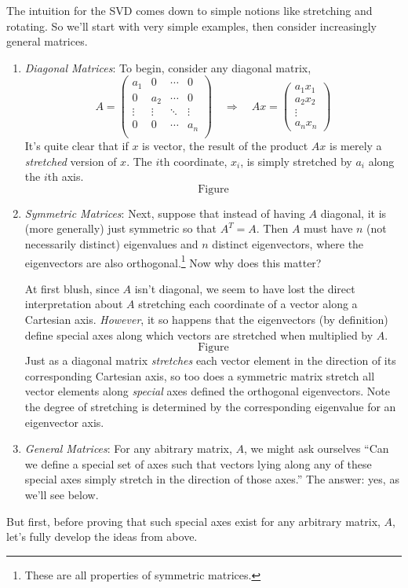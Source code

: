 \documentclass[12pt]{article}
\begin{document}
The intuition for the SVD comes down to simple notions like stretching and rotating. So we'll start with very simple examples, then consider increasingly general matrices.
\begin{enumerate}
\item {\sl Diagonal Matrices}: To begin, consider any diagonal matrix,
\[ 
    A = 
    \begin{pmatrix}
        a_1 & 0 & \cdots & 0 \\
        0 & a_2 & \cdots & 0 \\
        \vdots & \vdots & \ddots & \vdots \\
        0 & 0 & \cdots & a_n \\
    \end{pmatrix}
    \quad 
    \Rightarrow 
    \quad 
    Ax = \begin{pmatrix} a_1 x_1 \\ a_2 x_2 \\ \vdots \\
        a_n x_n \end{pmatrix}
\]
It's quite clear that if $x$ is vector, the result of the product $Ax$ is merely a \emph{stretched} version of $x$. The $i$th coordinate, $x_i$, is simply stretched by $a_i$ along the $i$th axis. 
\[ \text{Figure} \]

\item {\sl Symmetric Matrices}: Next, suppose that instead of having $A$ diagonal, it is (more generally) just symmetric so that $A^T = A$. Then $A$ must have $n$ (not necessarily distinct) eigenvalues and $n$ distinct eigenvectors, where the eigenvectors are also orthogonal.\footnote{These are all properties of symmetric matrices.} Now why does this matter? 

At first blush, since $A$ isn't diagonal, we seem to have lost the direct interpretation about $A$ stretching each coordinate of a vector along a Cartesian axis. \emph{However}, it so happens that the eigenvectors (by definition) define special axes along which vectors are stretched when multiplied by $A$.  
\[ \text{Figure} \]
Just as a diagonal matrix \emph{stretches} each vector element in the direction of its corresponding Cartesian axis, so too does a symmetric matrix stretch all vector elements along \emph{special} axes defined the orthogonal eigenvectors. Note the degree of stretching is determined by the corresponding eigenvalue for an eigenvector axis. 

\item {\sl General Matrices}: For any abitrary matrix, $A$, we might ask ourselves ``Can we define a special set of axes such that vectors lying along any of these special axes simply stretch in the direction of those axes.'' The answer: yes, as we'll see below.


\end{enumerate}
But first, before proving that such special axes exist for any arbitrary
matrix, $A$, let's fully develop the ideas from above.
\end{document}
